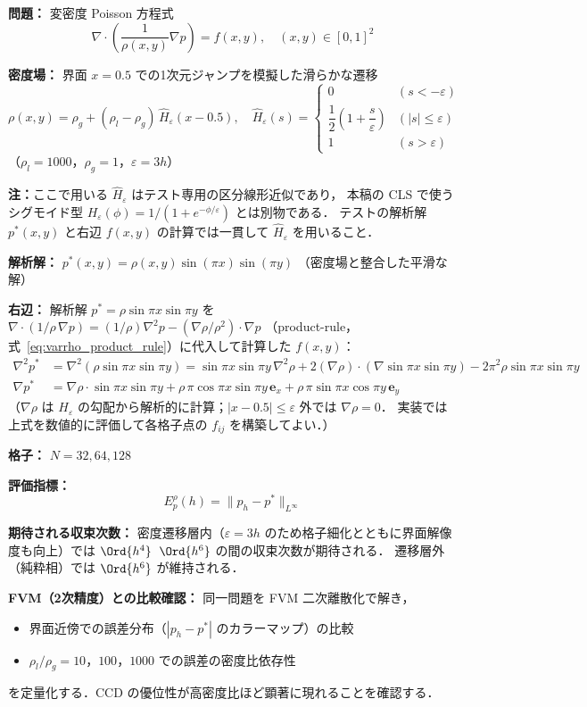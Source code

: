 \begin{tcolorbox}[algbox, title={テスト C-3 の設定}]
\textbf{問題：} 変密度 Poisson 方程式
\[
  \nabla\cdot\!\left(\frac{1}{\rho(x,y)}\nabla p\right) = f(x,y),
  \quad (x,y) \in [0,1]^2
\]

\textbf{密度場：} 界面 $x = 0.5$ での1次元ジャンプを模擬した滑らかな遷移
\[
  \rho(x,y) = \rho_g + (\rho_l - \rho_g)\,\hat{H}_\varepsilon(x - 0.5),
  \quad
  \hat{H}_\varepsilon(s) =
  \begin{cases}
    0 & (s < -\varepsilon) \\
    \dfrac{1}{2}\!\left(1 + \dfrac{s}{\varepsilon}\right) & (|s| \le \varepsilon) \\
    1 & (s > \varepsilon)
  \end{cases}
\]
（$\rho_l = 1000$，$\rho_g = 1$，$\varepsilon = 3h$）

\noindent\textbf{注：}ここで用いる $\hat{H}_\varepsilon$ はテスト専用の区分線形近似であり，
本稿の CLS で使うシグモイド型 $H_\varepsilon(\phi) = 1/(1+e^{-\phi/\varepsilon})$ とは別物である．
テストの解析解 $p^*(x,y)$ と右辺 $f(x,y)$ の計算では一貫して $\hat{H}_\varepsilon$ を用いること．

\textbf{解析解：} $p^*(x,y) = \rho(x,y)\sin(\pi x)\sin(\pi y)$
（密度場と整合した平滑な解）

\textbf{右辺：} 解析解 $p^* = \rho\sin\pi x\sin\pi y$ を
$\nabla\cdot(1/\rho\,\nabla p) = (1/\rho)\nabla^2 p - (\nabla\rho/\rho^2)\cdot\nabla p$
（product-rule，式~\eqref{eq:varrho_product_rule}）に代入して計算した $f(x,y)$：
\begin{align*}
  \nabla^2 p^* &= \nabla^2(\rho\sin\pi x\sin\pi y)
  = \sin\pi x\sin\pi y\,\nabla^2\rho
    + 2(\nabla\rho)\cdot(\nabla\sin\pi x\sin\pi y)
    - 2\pi^2\rho\sin\pi x\sin\pi y \\
  \nabla p^* &= \nabla\rho\cdot\sin\pi x\sin\pi y
    + \rho\,\pi\cos\pi x\sin\pi y\,\bm{e}_x
    + \rho\,\pi\sin\pi x\cos\pi y\,\bm{e}_y
\end{align*}
（$\nabla\rho$ は $H_\varepsilon$ の勾配から解析的に計算；$|x-0.5|\le\varepsilon$ 外では $\nabla\rho=0$．
実装では上式を数値的に評価して各格子点の $f_{ij}$ を構築してよい．）

\textbf{格子：} $N = 32, 64, 128$

\textbf{評価指標：}
\[
  E_p^{\rho}(h) = \|p_h - p^*\|_{L^\infty}
\]

\textbf{期待される収束次数：}
密度遷移層内（$\varepsilon = 3h$ のため格子細化とともに界面解像度も向上）では
$\Ord{h^4}$~$\Ord{h^6}$ の間の収束次数が期待される．
遷移層外（純粋相）では $\Ord{h^6}$ が維持される．

\textbf{FVM（2次精度）との比較確認：}
同一問題を FVM 二次離散化で解き，
\begin{itemize}
  \item 界面近傍での誤差分布（$|p_h - p^*|$ のカラーマップ）の比較
  \item $\rho_l/\rho_g = 10$，$100$，$1000$ での誤差の密度比依存性
\end{itemize}
を定量化する．CCD の優位性が高密度比ほど顕著に現れることを確認する．
\end{tcolorbox}

